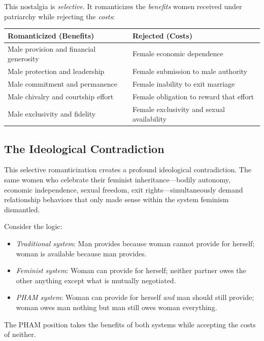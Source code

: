 \documentclass[12pt, letterpaper]{article}
\begin{document}
This nostalgia is \textit{selective}. It romanticizes the \textit{benefits} women received under patriarchy while rejecting the \textit{costs}:

\begin{center}
\begin{tabular}{|p{3in}|p{3in}|}
\hline
\textbf{Romanticized (Benefits)} & \textbf{Rejected (Costs)} \\
\hline
Male provision and financial generosity & Female economic dependence \\
\hline
Male protection and leadership & Female submission to male authority \\
\hline
Male commitment and permanence & Female inability to exit marriage \\
\hline
Male chivalry and courtship effort & Female obligation to reward that effort \\
\hline
Male exclusivity and fidelity & Female exclusivity and sexual availability \\
\hline
\end{tabular}
\end{center}

\subsection{The Ideological Contradiction}

This selective romanticization creates a profound ideological contradiction. The same women who celebrate their feminist inheritance---bodily autonomy, economic independence, sexual freedom, exit rights---simultaneously demand relationship behaviors that only made sense within the system feminism dismantled.

Consider the logic:
\begin{itemize}
    \item \textit{Traditional system}: Man provides because woman cannot provide for herself; woman is available because man provides.
    \item \textit{Feminist system}: Woman can provide for herself; neither partner owes the other anything except what is mutually negotiated.
    \item \textit{PHAM system}: Woman can provide for herself \textit{and} man should still provide; woman owes man nothing but man still owes woman everything.
\end{itemize}

The PHAM position takes the benefits of both systems while accepting the costs of neither.
\end{document}
